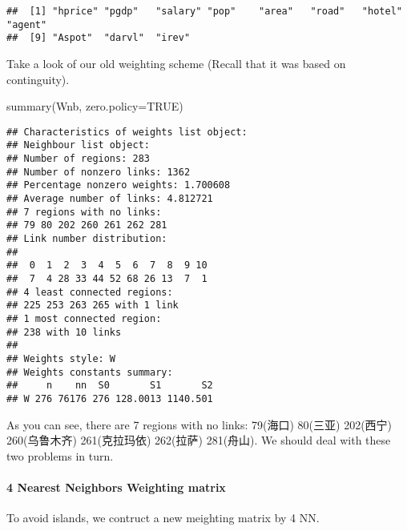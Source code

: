 \documentclass[
]{article}
\newenvironment{Shaded}{\begin{snugshade}}{\end{snugshade}}
\newcommand{\AttributeTok}[1]{\textcolor[rgb]{0.77,0.63,0.00}{#1}}
\newcommand{\ConstantTok}[1]{\textcolor[rgb]{0.00,0.00,0.00}{#1}}
\newcommand{\FunctionTok}[1]{\textcolor[rgb]{0.00,0.00,0.00}{#1}}
\newcommand{\NormalTok}[1]{#1}
\begin{document}
\begin{verbatim}
##  [1] "hprice" "pgdp"   "salary" "pop"    "area"   "road"   "hotel"  "agent" 
##  [9] "Aspot"  "darvl"  "irev"
\end{verbatim}

Take a look of our old weighting scheme (Recall that it was based on
continguity).

\begin{Shaded}
\begin{Highlighting}[]
\FunctionTok{summary}\NormalTok{(Wnb, }\AttributeTok{zero.policy=}\ConstantTok{TRUE}\NormalTok{)}
\end{Highlighting}
\end{Shaded}

\begin{verbatim}
## Characteristics of weights list object:
## Neighbour list object:
## Number of regions: 283 
## Number of nonzero links: 1362 
## Percentage nonzero weights: 1.700608 
## Average number of links: 4.812721 
## 7 regions with no links:
## 79 80 202 260 261 262 281
## Link number distribution:
## 
##  0  1  2  3  4  5  6  7  8  9 10 
##  7  4 28 33 44 52 68 26 13  7  1 
## 4 least connected regions:
## 225 253 263 265 with 1 link
## 1 most connected region:
## 238 with 10 links
## 
## Weights style: W 
## Weights constants summary:
##     n    nn  S0       S1       S2
## W 276 76176 276 128.0013 1140.501
\end{verbatim}

As you can see, there are 7 regions with no links: 79(海口) 80(三亚)
202(西宁) 260(乌鲁木齐) 261(克拉玛依) 262(拉萨) 281(舟山). We should
deal with these two problems in turn.

\hypertarget{nearest-neighbors-weighting-matrix}{%
\paragraph{4 Nearest Neighbors Weighting
matrix}\label{nearest-neighbors-weighting-matrix}}

To avoid islands, we contruct a new meighting matrix by 4 NN.
\end{document}
